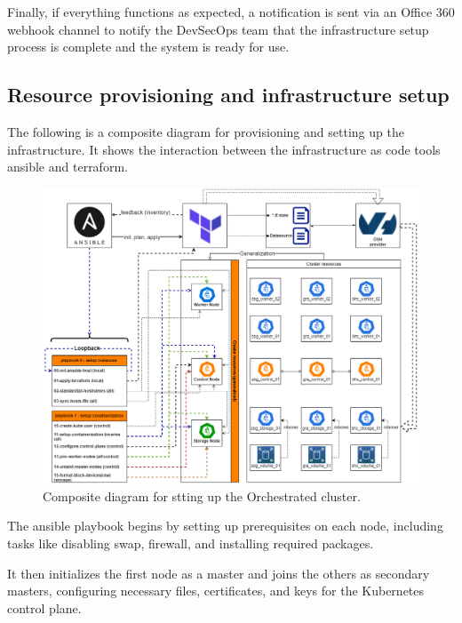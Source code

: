 \hspace{7mm}Finally, if everything functions as expected, a notification is sent via an Office 360 webhook channel to notify the DevSecOps team that the infrastructure setup process is complete and the system is ready for use.

\subsection{Resource provisioning and infrastructure setup}

\hspace{7mm}The following is a composite diagram for provisioning and setting up the infrastructure. It shows the interaction between the infrastructure as code tools ansible and terraform. 

\begin{figure}[H]\centering
\includegraphics[width=1.0\textwidth,angle=00]{assets/f19.png}
\caption{Composite diagram for stting up the Orchestrated cluster.}
\label{fig:Orchestrated cluster setup}
\end{figure}

\hspace{7mm}The ansible playbook begins by setting up prerequisites on each node, including tasks like disabling swap, firewall, and installing required packages.

\hspace{7mm}It then initializes the first node as a master and joins the others as secondary masters, configuring necessary files, certificates, and keys for the Kubernetes control plane.

